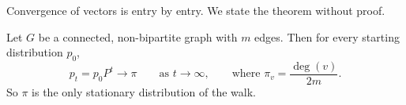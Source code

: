 Convergence of vectors is entry by entry. We state the theorem without proof.

%

\begin{theorem}\label{thm:convergence-0910}
    Let $G$ be a connected, non-bipartite graph with $m$ edges. Then for every starting distribution
    $p_0$,
    \[p_t = p_0 P^t \longrightarrow \pi \qquad \text{as } t \to \infty, \qquad \text{where } \pi_v = \frac{\deg(v)}{2m}.\]
    So $\pi$ is the only stationary distribution of the walk.
\end{theorem}

